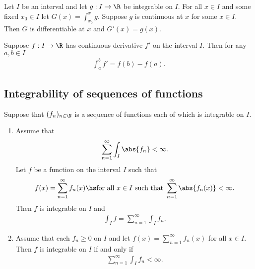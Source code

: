 \documentclass{article}
\begin{document}
\begin{theorem}[Notes 4.10]
    Let $I$ be an interval and let $g:I\to\R$ be integrable on $I$. For all $x\in I$ and 
    some fixed $x_0\in I$ let $G(x) = \int_{x_0}^x g$. Suppose $g$ is continuous at $x$ 
    for some $x\in I$. Then $G$ is differentiable at $x$ and $G'(x)=g(x)$.
\end{theorem}

\begin{theorem}[Notes 4.11]
    Suppose $f:I\to\R$ has continuous derivative $f'$ on the interval $I$. Then for any 
    $a,b\in I$ 
    \begin{align*}
        \int_a^b f' = f(b) - f(a).
    \end{align*}
\end{theorem}

\subsection{Integrability of sequences of functions}

\begin{theorem}[Notes 4.3]
    Suppose that $(f_n)_{n\in\N}$ is a sequence of functions each of which is integrable on $I$.
    \begin{enumerate}
        \item Assume that \begin{align*}
            \sum_{n=1}^\infty \int_I \abs{f_n} < \infty.
        \end{align*}
        Let $f$ be a function on the interval $I$ such that \begin{align*}
            f(x) = \sum_{n=1}^\infty f_n(x)\hs\text{for all $x\in I$ such that }\sum_{n=1}^\infty \abs{f_n(x)}<\infty. 
        \end{align*}
        Then $f$ is integrable on $I$ and \begin{align*}
            \int_I f = \sum_{n=1}^\infty \int_I f_n.
        \end{align*}
        \item Assume that each $f_n\geq 0$ on $I$ and let $f(x)=\sum_{n=1}^\infty f_n(x)$ for all $x\in I$. Then $f$ 
            is integrable on $I$ if and only if \begin{align*}
                \sum_{n=1}^\infty \int_I f_n < \infty. 
            \end{align*}
    \end{enumerate}
\end{theorem}
\end{document}
